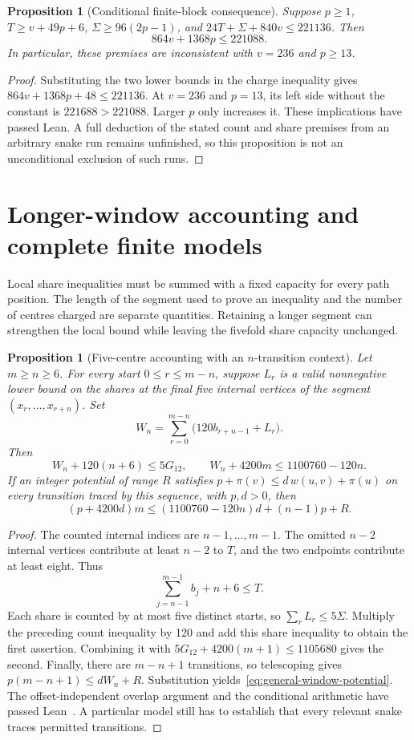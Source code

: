 \documentclass[11pt,a4paper]{article}
\newtheorem{proposition}[theorem]{Proposition}
\theoremstyle{definition}
\theoremstyle{remark}
\begin{document}
\begin{proposition}[Conditional finite-block consequence]\label{prop:finite-block-conditional}
Suppose $p\ge1$, $T\ge v+49p+6$, $\Sigma\ge96(2p-1)$, and $24T+\Sigma+840v\le221136$. Then
\[
864v+1368p\le221088.
\]
In particular, these premises are inconsistent with $v=236$ and $p\ge13$.
\end{proposition}
\begin{proof}
Substituting the two lower bounds in the charge inequality gives
$864v+1368p+48\le221136$. At $v=236$ and $p=13$, its left side without the constant is $221688>221088$. Larger $p$ only increases it. These implications have passed Lean. A full deduction of the stated count and share premises from an arbitrary snake run remains unfinished, so this proposition is not an unconditional exclusion of such runs.
\end{proof}

\section{Longer-window accounting and complete finite models}\label{sec:long-models}
Local share inequalities must be summed with a fixed capacity for every path position. The length of the segment used to prove an inequality and the number of centres charged are separate quantities. Retaining a longer segment can strengthen the local bound while leaving the fivefold share capacity unchanged.

\begin{proposition}[Five-centre accounting with an $n$-transition context]\label{prop:general-window-budget}
Let $m\ge n\ge6$. For every start $0\le r\le m-n$, suppose $L_r$ is a valid nonnegative lower bound on the shares at the final five internal vertices of the segment $(x_r,\ldots,x_{r+n})$. Set
\[
W_n=\sum_{r=0}^{m-n}\bigl(120b_{r+n-1}+L_r\bigr).
\]
Then
\[
W_n+120(n+6)\le5G_{12},\qquad
W_n+4200m\le1100760-120n.
\]
If an integer potential of range $R$ satisfies $p+\pi(v)\le d\,w(u,v)+\pi(u)$ on every transition traced by this sequence, with $p,d>0$, then
\begin{equation}\label{eq:general-window-potential}
(p+4200d)m\le(1100760-120n)d+(n-1)p+R.
\end{equation}
\end{proposition}
\begin{proof}
The counted internal indices are $n-1,\ldots,m-1$. The omitted $n-2$ internal vertices contribute at least $n-2$ to $T$, and the two endpoints contribute at least eight. Thus
\[
\sum_{j=n-1}^{m-1}b_j+n+6\le T.
\]
Each share is counted by at most five distinct starts, so $\sum_r L_r\le5\Sigma$. Multiply the preceding count inequality by 120 and add this share inequality to obtain the first assertion. Combining it with $5G_{12}+4200(m+1)\le1105680$ gives the second. Finally, there are $m-n+1$ transitions, so telescoping gives $p(m-n+1)\le dW_n+R$. Substitution yields~\eqref{eq:general-window-potential}. The offset-independent overlap argument and the conditional arithmetic have passed Lean~\cite{geometricarchive}. A particular model still has to establish that every relevant snake traces permitted transitions.
\end{proof}
\end{document}
